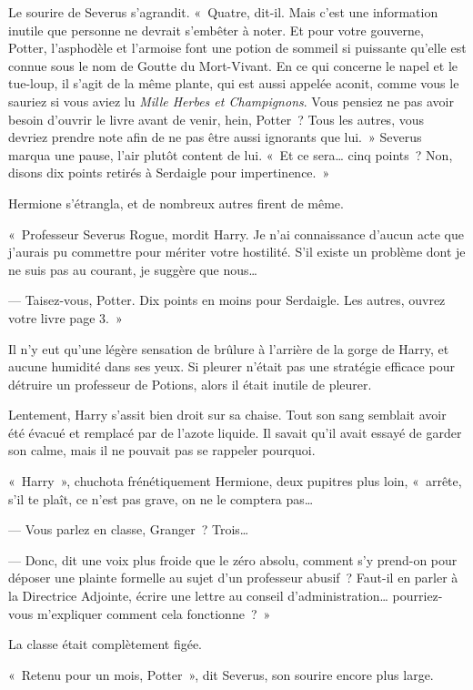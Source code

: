 Le sourire de Severus s'agrandit.
«~Quatre, dit-il.
Mais c'est une information inutile que personne ne devrait s'embêter à noter.
Et pour votre gouverne, Potter, l'asphodèle et l'armoise font une potion de sommeil si puissante qu'elle est connue sous le nom de Goutte du Mort-Vivant.
En ce qui concerne le napel et le tue-loup, il s'agit de la même plante, qui est aussi appelée aconit, comme vous le sauriez si vous aviez lu \emph{Mille Herbes et Champignons}.
Vous pensiez ne pas avoir besoin d'ouvrir le livre avant de venir, hein, Potter~?
Tous les autres, vous devriez prendre note afin de ne pas être aussi ignorants que lui.~»
Severus marqua une pause, l'air plutôt content de lui.
«~Et ce sera… cinq points~?
Non, disons dix points retirés à Serdaigle pour impertinence.~»

Hermione s'étrangla, et de nombreux autres firent de même.

«~Professeur Severus Rogue, mordit Harry.
Je n'ai connaissance d'aucun acte que j'aurais pu commettre pour mériter votre hostilité.
S'il existe un problème dont je ne suis pas au courant, je suggère que nous…

--- Taisez-vous, Potter.
Dix points en moins pour Serdaigle.
Les autres, ouvrez votre livre page 3.~»

Il n'y eut qu'une légère sensation de brûlure à l'arrière de la gorge de Harry, et aucune humidité dans ses yeux.
Si pleurer n'était pas une stratégie efficace pour détruire un professeur de Potions, alors il était inutile de pleurer.

Lentement, Harry s'assit bien droit sur sa chaise.
Tout son sang semblait avoir été évacué et remplacé par de l'azote liquide.
Il savait qu'il avait essayé de garder son calme, mais il ne pouvait pas se rappeler pourquoi.

«~Harry~», chuchota frénétiquement Hermione, deux pupitres plus loin, «~arrête, s'il te plaît, ce n'est pas grave, on ne le comptera pas…

--- Vous parlez en classe, Granger~?
Trois…

--- Donc, dit une voix plus froide que le zéro absolu, comment s'y prend-on pour déposer une plainte formelle au sujet d'un professeur abusif~?
Faut-il en parler à la Directrice Adjointe, écrire une lettre au conseil d'administration… pourriez-vous m'expliquer comment cela fonctionne~?~»

La classe était complètement figée.

«~Retenu pour un mois, Potter~», dit Severus, son sourire encore plus large.

